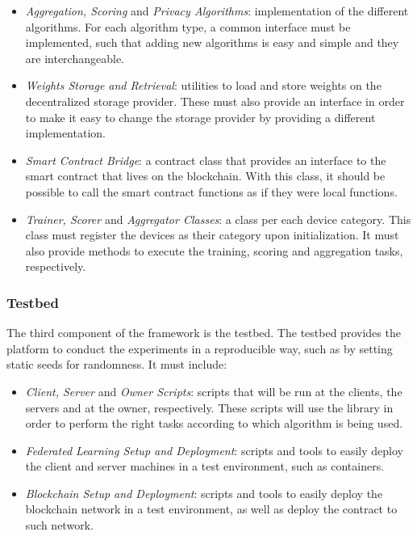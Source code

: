 \begin{itemize}
    \item \textit{Aggregation, Scoring} and \textit{Privacy Algorithms}: implementation of the different algorithms. For each algorithm type, a common interface must be implemented, such that adding new algorithms is easy and simple and they are interchangeable.
    
    \item \textit{Weights Storage and Retrieval}: utilities to load and store weights on the decentralized storage provider. These must also provide an interface in order to make it easy to change the storage provider by providing a different implementation.
    
    \item \textit{Smart Contract Bridge}: a contract class that provides an interface to the smart contract that lives on the blockchain. With this class, it should be possible to call the smart contract functions as if they were local functions.
    
    \item \textit{Trainer, Scorer} and \textit{Aggregator Classes}: a class per each device category. This class must register the devices as their category upon initialization. It must also provide methods to execute the training, scoring and aggregation tasks, respectively.
\end{itemize}

\subsubsection{Testbed}\label{meth:testbed}

The third component of the framework is the testbed. The testbed provides the platform to conduct the experiments in a reproducible way, such as by setting static seeds for randomness. It must include:

\begin{itemize}
    \item \textit{Client, Server} and \textit{Owner Scripts}: scripts that will be run at the clients, the servers and at the owner, respectively. These scripts will use the library in order to perform the right tasks according to which algorithm is being used.
    
    \item \textit{Federated Learning Setup and Deployment}: scripts and tools to easily deploy the client and server machines in a test environment, such as containers.
    
    \item \textit{Blockchain Setup and Deployment}: scripts and tools to easily deploy the blockchain network in a test environment, as well as deploy the contract to such network.
\end{itemize}


